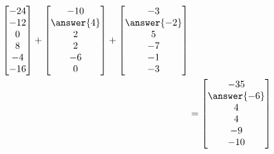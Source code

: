 \documentclass{ximera}
\begin{document}
\begin{example}
\begin{align*}
    \colvector{-24\\-12\\0\\8\\-4\\-16}+
    \colvector{-10\\\answer{4}\\2\\2\\-6\\0}+
    \colvector{-3\\\answer{-2}\\5\\-7\\-1\\-3} \\
    &=\colvector{-35\\\answer{-6}\\4\\4\\-9\\-10}
  \end{align*}
  

\end{example}
\end{document}
